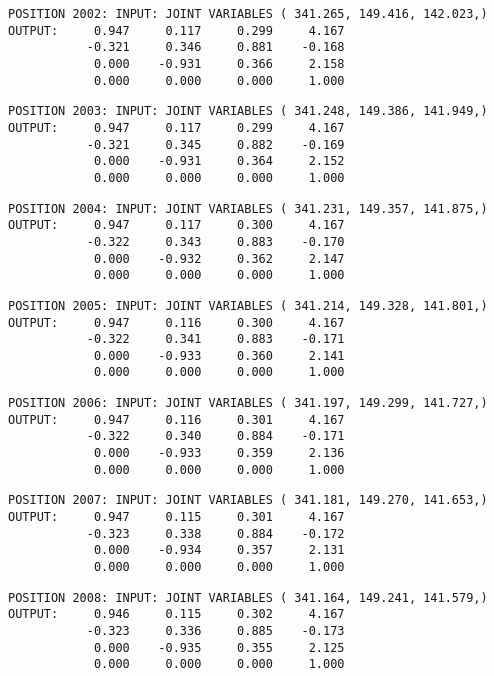 \begin{verbatim}
POSITION 2002: INPUT: JOINT VARIABLES ( 341.265, 149.416, 142.023,)
OUTPUT:     0.947     0.117     0.299     4.167
           -0.321     0.346     0.881    -0.168
            0.000    -0.931     0.366     2.158
            0.000     0.000     0.000     1.000
\end{verbatim} \pagebreak[1]\begin{verbatim}
POSITION 2003: INPUT: JOINT VARIABLES ( 341.248, 149.386, 141.949,)
OUTPUT:     0.947     0.117     0.299     4.167
           -0.321     0.345     0.882    -0.169
            0.000    -0.931     0.364     2.152
            0.000     0.000     0.000     1.000
\end{verbatim} \pagebreak[1]\begin{verbatim}
POSITION 2004: INPUT: JOINT VARIABLES ( 341.231, 149.357, 141.875,)
OUTPUT:     0.947     0.117     0.300     4.167
           -0.322     0.343     0.883    -0.170
            0.000    -0.932     0.362     2.147
            0.000     0.000     0.000     1.000
\end{verbatim} \pagebreak[1]\begin{verbatim}
POSITION 2005: INPUT: JOINT VARIABLES ( 341.214, 149.328, 141.801,)
OUTPUT:     0.947     0.116     0.300     4.167
           -0.322     0.341     0.883    -0.171
            0.000    -0.933     0.360     2.141
            0.000     0.000     0.000     1.000
\end{verbatim} \pagebreak[1]\begin{verbatim}
POSITION 2006: INPUT: JOINT VARIABLES ( 341.197, 149.299, 141.727,)
OUTPUT:     0.947     0.116     0.301     4.167
           -0.322     0.340     0.884    -0.171
            0.000    -0.933     0.359     2.136
            0.000     0.000     0.000     1.000
\end{verbatim} \pagebreak[1]\begin{verbatim}
POSITION 2007: INPUT: JOINT VARIABLES ( 341.181, 149.270, 141.653,)
OUTPUT:     0.947     0.115     0.301     4.167
           -0.323     0.338     0.884    -0.172
            0.000    -0.934     0.357     2.131
            0.000     0.000     0.000     1.000
\end{verbatim} \pagebreak[1]\begin{verbatim}
POSITION 2008: INPUT: JOINT VARIABLES ( 341.164, 149.241, 141.579,)
OUTPUT:     0.946     0.115     0.302     4.167
           -0.323     0.336     0.885    -0.173
            0.000    -0.935     0.355     2.125
            0.000     0.000     0.000     1.000
\end{verbatim} \pagebreak[1]\begin{verbatim}

\end{verbatim}
